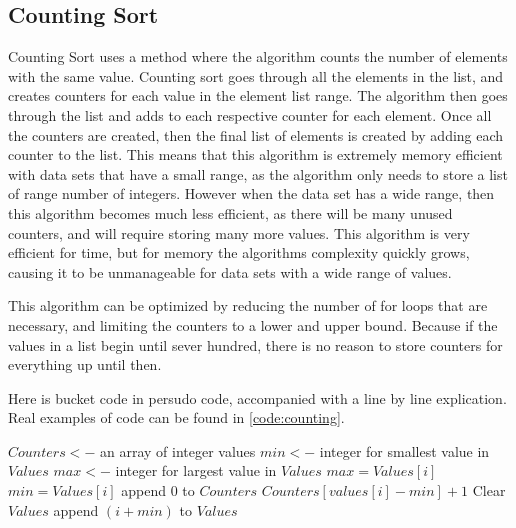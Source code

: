 \documentclass{article}
\begin{document}
\subsection{Counting Sort}
\begin{multicols}{2}
Counting Sort uses a method where the algorithm counts the number of elements with the same value. Counting sort goes through all the elements in the list, and creates counters for each value in the element list range. The algorithm then goes through the list and adds to each respective counter for each element. Once all the counters are created, then the final list of elements is created by adding each counter to the list. This means that this algorithm is extremely memory efficient with data sets that have a small range, as the algorithm only needs to store a list of range number of integers. However when the data set has a wide range, then this algorithm becomes much less efficient, as there will be many unused counters, and will require storing many more values. This algorithm is very efficient for time, but for memory the algorithms complexity quickly grows, causing it to be unmanageable for data sets with a wide range of values.

This algorithm can be optimized by reducing the  number of for loops that are necessary, and limiting the counters to a lower and upper bound. Because if the values in a list  begin until sever hundred, there is no reason to store counters for everything up until then.

Here is bucket code in persudo code, accompanied with a line by line explication. Real examples of code can be found in \ref{code:counting}.
\end{multicols}
\begin{algorithmic}
\State $Counters<-$ an array of integer values
\State $min<-$ integer for smallest value in $Values$
\State $max<-$ integer for largest value in $Values$
\State $max=Values[i]$
\EndIf
{}
\State $min=Values[i]$
\EndIf
\EndFor
{}
\State append $0$ to $Counters$
\EndFor
{}
\State $Counters[values[i]-min] + 1$
\EndFor
\State Clear $Values$
\State append $(i+min)$ to $Values$
\EndFor
\EndFor
\EndFunction
\end{algorithmic}
\end{document}
